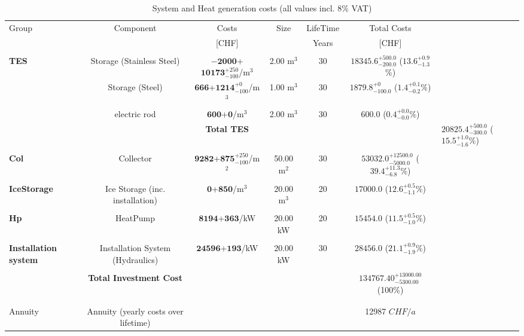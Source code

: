 \documentclass[english]{SPFShortReport}
\begin{document}
\begin{table}[!ht]
\centering
\caption{System and Heat generation costs (all values incl. 8$\%$ VAT) }
\begin{adjustbox}{max width =\textwidth}
\begin{tabular}{l | c c c c c } 
\hline
\hline
Group &Component &Costs &Size &LifeTime &Total Costs \\ 
 & &[CHF] & &Years &[CHF]\\ 
\hline
\\
\textbf{TES} & Storage (Stainless Steel) & $\mathbf{-2000}$+$\mathbf{10173}^{+250}_{-100}$/m$^3$ & 2.00 m$^3$ & 30 & $\mathbf{18345.6}^{+500.0}_{-200.0}$ ($\mathbf{13.6}^{+0.9}_{-1.3}$\%) \\
 & Storage (Steel) & $\mathbf{666}$+$\mathbf{1214}^{+0}_{-100}$/m$^3$ & 1.00 m$^3$ & 30 & $\mathbf{1879.8}^{+0}_{-100.0}$ ($\mathbf{1.4}^{+0.1}_{-0.2}$\%) \\
 & electric rod & $\mathbf{600}$+$\mathbf{0}$/m$^3$ & 2.00 m$^3$ & 30 & $\mathbf{600.0}$ ($\mathbf{0.4}^{+0.0}_{-0.0}$\%) \\
&
 & \textbf{Total TES} & & & & $\mathbf{20825.4}^{+500.0}_{-300.0}$ ($\mathbf{15.5}^{+1.0}_{-1.6}$\%) \\
\hline \\
\textbf{Col} & Collector & $\mathbf{9282}$+$\mathbf{875}^{+250}_{-100}$/m$^2$ & 50.00 m$^2$ & 30 & $\mathbf{53032.0}^{+12500.0}_{-5000.0}$ ($\mathbf{39.4}^{+11.3}_{-6.8}$\%) \\
\hline \\
\textbf{IceStorage} & Ice Storage (inc. installation) & $\mathbf{0}$+$\mathbf{850}$/m$^3$ & 20.00 m$^3$ & 20 & $\mathbf{17000.0}$ ($\mathbf{12.6}^{+0.5}_{-1.1}$\%) \\
\hline \\
\textbf{Hp} & HeatPump & $\mathbf{8194}$+$\mathbf{363}$/kW & 20.00 kW & 20 & $\mathbf{15454.0}$ ($\mathbf{11.5}^{+0.5}_{-1.0}$\%) \\
\hline \\
\textbf{Installation system} & Installation System (Hydraulics) & $\mathbf{24596}$+$\mathbf{193}$/kW & 20.00 kW & 30 & $\mathbf{28456.0}$ ($\mathbf{21.1}^{+0.9}_{-1.9}$\%) \\
\hline \\
 & \textbf{Total Investment Cost} & & & & \textbf{$\mathbf{134767.40}^{+13000.00}_{-5300.00}$} (100\%) \\ 
\hline \\ 
\hline \\ 
Annuity & Annuity (yearly costs over lifetime)  &&& & 12987 $CHF/a$  \\ 

\end{tabular}
\end{adjustbox}
\end{table}
\end{document}
